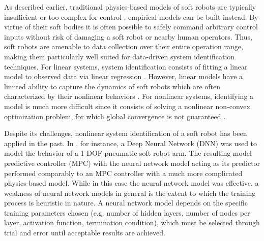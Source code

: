 As described earlier, traditional physics-based models of soft robots are typically insufficient or too complex  for control , empirical models can be built instead.
By virtue of their soft bodies it is often possible to safely command arbitrary control inputs without risk of damaging a soft robot or nearby human operators.
Thus, soft robots are amenable to data collection over their entire operation range, making them particularly well suited for data-driven system identification techniques.
For linear systems, system identification consists of fitting a linear model to observed data via linear regression .
However, linear models have a limited ability to capture the dynamics of soft robots which are often characterized by their nonlinear behaviors .
For nonlinear systems, identifying a model is much more difficult since it consists of solving a nonlinear non-convex optimization problem, for which global convergence is not guaranteed .

Despite its challenges, nonlinear system identification of a soft robot has been applied in the past.
In \cite{gillespie2018learning}, for instance, a Deep Neural Network (DNN) was used to model the behavior of a 1 DOF pneumatic soft robot arm.
The resulting model predictive controller (MPC) with the neural network model acting as its predictor performed comparably to an MPC controller with a much more complicated physics-based model.
While in this case the neural network model was effective, a weakness of neural network models in general is the extent to which the training process is heuristic in nature.
A neural network model depends on the specific training parameters chosen (e.g. number of hidden layers, number of nodes per layer, activation function, termination condition), which must be selected through trial and error until acceptable results are achieved.


